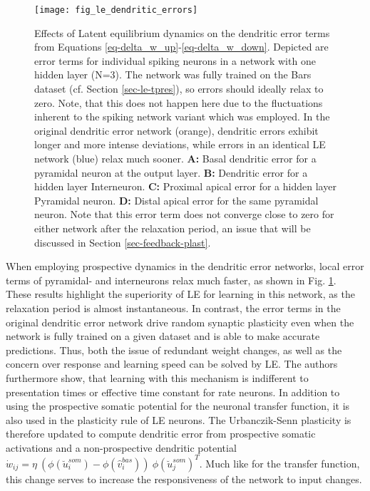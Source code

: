 \begin{figure}[h]
  \centering
  \texttt{[image: fig\_le\_dendritic\_errors]}
  \caption{Effects of Latent equilibrium dynamics on the dendritic error terms from Equations
    \ref{eq-delta_w_up}-\ref{eq-delta_w_down}. Depicted are error terms for individual spiking neurons in a network with
    one hidden layer (N=3). The network was fully trained on the Bars dataset (cf. Section \ref{sec-le-tpres}), so
    errors should ideally relax to zero. Note, that this does not happen here due to the fluctuations inherent to the
    spiking network variant which was employed. In the original dendritic error network (orange), dendritic errors
    exhibit longer and more intense deviations, while errors in an identical LE network (blue) relax much sooner.
    \textbf{A:} Basal dendritic error for a pyramidal neuron at the output layer. \textbf{B:} Dendritic error for a
    hidden layer Interneuron. \textbf{C:} Proximal apical error for a hidden layer Pyramidal neuron. \textbf{D:} Distal
    apical error for the same pyramidal neuron. Note that this error term does not converge close to zero for either
    network after the relaxation period, an issue that will be discussed in Section \ref{sec-feedback-plast}.}
  \label{fig-error-comp-le}
\end{figure}


When employing prospective dynamics in the dendritic error networks, local error terms of pyramidal- and interneurons
relax much faster, as shown in Fig. \ref{fig-error-comp-le}. These results highlight the superiority of LE for
learning in this network, as the relaxation period is almost instantaneous. In contrast, the error terms in the original
dendritic error network drive random synaptic plasticity even when the network is fully trained on a given dataset and
is able to make accurate predictions. Thus, both the issue of redundant weight changes, as well as the concern over
response and learning speed can be solved by LE. The authors furthermore show, that learning with this mechanism is 
indifferent to presentation times or effective time constant for rate neurons.
In addition to using the prospective somatic potential for the neuronal transfer function, it is also used in the
plasticity rule of LE neurons. The Urbanczik-Senn plasticity is therefore updated to compute dendritic error from
prospective somatic activations and a non-prospective dendritic potential $\dot{w}_{ij}= \eta \ (
\phi(\breve{u}_i^{som}) - \phi(\hat{v}_i^{bas}) ) \ \phi(\breve{u}_j^{som})^T$. Much like for the transfer function,
this change serves to increase the responsiveness of the network to input changes.

